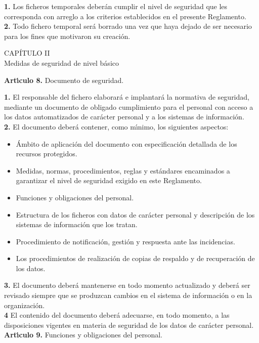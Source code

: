{\bf 1.} Los ficheros temporales deber\'an cumplir el nivel de seguridad que 
les corresponda con arreglo a los criterios establecidos en el presente 
Reglamento.\\

{\bf 2.} Todo fichero temporal ser\'a borrado una vez que haya dejado de ser 
necesario para los fines que motivaron su creaci\'on.
\begin{center}
{\LARGE CAP\'ITULO II}\\ {\large Medidas de seguridad de nivel b\'asico}
\end{center}
\vspace{0.3cm}
{\large {\bf Art\'{\i}culo 8.} Documento de seguridad.}

{\bf 1.} El responsable del fichero elaborar\'a e implantar\'a la normativa de 
seguridad, mediante un documento de obligado cumplimiento para el personal con 
acceso a los datos automatizados de car\'acter personal y a los sistemas de 
informaci\'on.\\

{\bf 2.} El documento deber\'a contener, como m\'{\i}nimo, los siguientes 
aspectos:
\begin{itemize}
\item[(a)] \'Ambito de aplicaci\'on del documento con especificaci\'on 
detallada de los recursos protegidos.
\item[(b)] Medidas, normas, procedimientos, reglas y est\'andares encaminados a 
garantizar el nivel de seguridad exigido en este Reglamento.
\item[(c)] Funciones y obligaciones del personal.
\item[(d)] Estructura de los ficheros con datos de car\'acter personal y 
descripci\'on de los sistemas de informaci\'on que los tratan.
\item[(e)] Procedimiento de notificaci\'on, gesti\'on y respuesta ante las 
incidencias.
\item[(f)] Los procedimientos de realizaci\'on de copias de respaldo y de 
recuperaci\'on de los datos.
\end{itemize}

{\bf 3.} El documento deber\'a mantenerse en todo momento actualizado y 
deber\'a ser revisado siempre que se produzcan cambios en el sistema de 
informaci\'on o en la organizaci\'on.\\

{\bf 4} El contenido del documento deber\'a adecuarse, en todo momento, a las 
disposiciones vigentes en materia de seguridad de los datos de car\'acter 
personal.
\vspace{0.3cm}\\
{\large {\bf Art\'{\i}culo 9.} Funciones y obligaciones del personal.}

